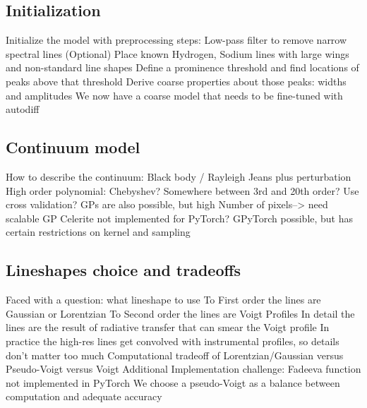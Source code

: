 \documentclass[modern]{aastex631}
\begin{document}
\subsection{Initialization}
\begin{outline}
  \1 Initialize the model with preprocessing steps:
  \2 Low-pass filter to remove narrow spectral lines
  \2 (Optional) Place known Hydrogen, Sodium lines with large wings and non-standard line shapes
  \2 Define a prominence threshold and find locations of peaks above that threshold
  \2 Derive coarse properties about those peaks: widths and amplitudes
  \1 We now have a coarse model that needs to be fine-tuned with autodiff
\end{outline}

\subsection{Continuum model}
\begin{outline}
  \1 How to describe the continuum:
  \2 Black body / Rayleigh Jeans plus perturbation
  \2 High order polynomial: Chebyshev? Somewhere between 3rd and 20th order?
  \2 Use cross validation?
  \1 GPs are also possible, but high Number of pixels--> need scalable GP
  \2 Celerite not implemented for PyTorch?
  \2 GPyTorch possible, but has certain restrictions on kernel and sampling
\end{outline}

\subsection{Lineshapes choice and tradeoffs}
\begin{outline}
  \1 Faced with a question: what lineshape to use
  \2 To First order the lines are Gaussian or Lorentzian
  \2 To Second order the lines are Voigt Profiles
  \2 In detail the lines are the result of radiative transfer that can smear the Voigt profile
  \2 In practice the high-res lines get convolved with instrumental profiles, so details don't matter too much
  \1 Computational tradeoff of Lorentzian/Gaussian versus Pseudo-Voigt versus Voigt
  \2 Additional Implementation challenge: Fadeeva function not implemented in PyTorch
  \1 We choose a pseudo-Voigt as a balance between computation and adequate accuracy
\end{outline}
\end{document}
